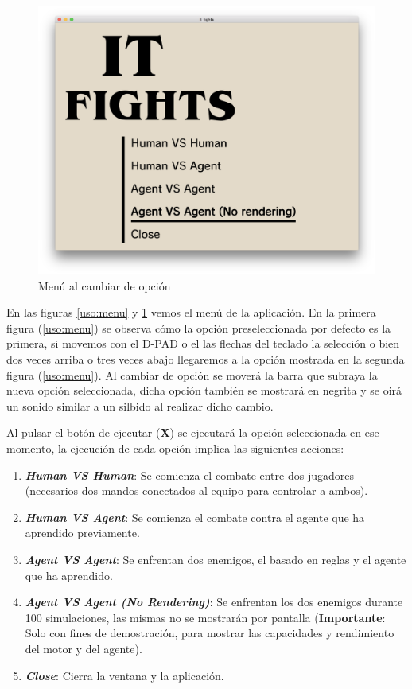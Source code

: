 \begin{figure}[h]
	\centerline{\includegraphics[width=17cm]{otros/manual/menu2.png}}
	\caption{Menú al cambiar de opción}
	\label{uso:menu2}
\end{figure}

En las figuras \ref{uso:menu} y \ref{uso:menu2} vemos el menú de la aplicación. En la primera figura (\ref{uso:menu}) se observa cómo la opción preseleccionada por defecto es la primera, si movemos con el D-PAD o el las flechas del teclado la selección o bien dos veces arriba o tres veces abajo llegaremos a la opción mostrada en la segunda figura (\ref{uso:menu}). Al cambiar de opción se moverá la barra que subraya la nueva opción seleccionada, dicha opción también se mostrará en negrita y se oirá un sonido similar a un silbido al realizar dicho cambio.

\bigskip

Al pulsar el botón de ejecutar (\textbf{X}) se ejecutará la opción seleccionada en ese momento, la ejecución de cada opción implica las siguientes acciones:

\begin{enumerate}
	\item \textbf{\textit{Human VS Human}}: Se comienza el combate entre dos jugadores (necesarios dos mandos conectados al equipo para controlar a ambos).
	\item \textbf{\textit{Human VS Agent}}: Se comienza el combate contra el agente que ha aprendido previamente.
	\item \textbf{\textit{Agent VS Agent}}: Se enfrentan dos enemigos, el basado en reglas y el agente que ha aprendido.
	\item \textbf{\textit{Agent VS Agent (No Rendering)}}: Se enfrentan los dos enemigos durante 100 simulaciones, las mismas no se mostrarán por pantalla (\textbf{Importante}: Solo con fines de demostración, para mostrar las capacidades y rendimiento del motor y del agente).
	\item \textbf{\textit{Close}}: Cierra la ventana y la aplicación.
\end{enumerate}


